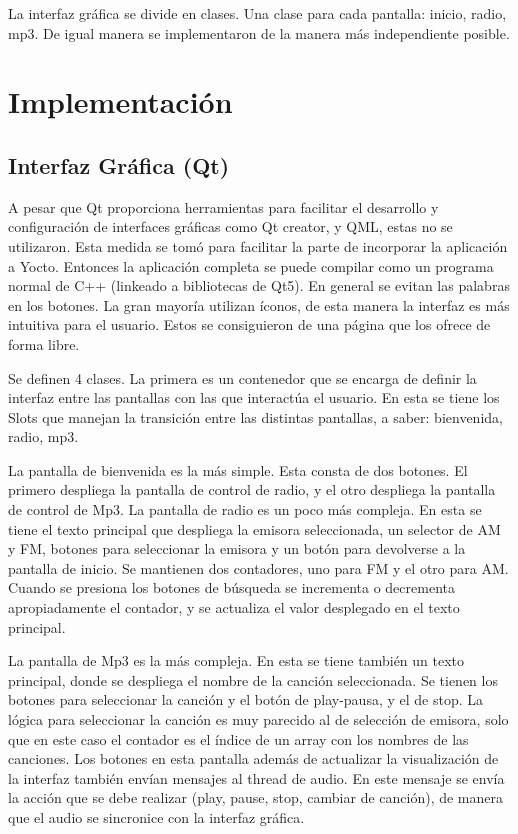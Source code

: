 La interfaz gráfica se divide en clases. Una clase para cada pantalla: inicio, radio, mp3. De igual
manera se implementaron de la manera más independiente posible. 

\section{Implementación}
\label{sec:implementation}
\subsection{Interfaz Gráfica (Qt)}
\label{sec:qt}

A pesar que Qt proporciona herramientas para facilitar el desarrollo y configuración de interfaces
gráficas como Qt creator, y QML, estas no se utilizaron. Esta medida se tomó para facilitar la parte
de incorporar la aplicación a Yocto. Entonces la aplicación completa se puede compilar como un
programa normal de C++ (linkeado a bibliotecas de Qt5). En general se evitan las palabras en los
botones. La gran mayoría utilizan íconos, de esta manera la interfaz es más intuitiva para el
usuario. Estos se consiguieron de una página que los ofrece de forma libre. %

Se definen 4 clases. La primera es un contenedor que se encarga de definir la interfaz entre las
pantallas con las que interactúa el usuario. En esta se tiene los Slots que manejan la transición
entre las distintas pantallas, a saber: bienvenida, radio, mp3.

La pantalla de bienvenida es la más simple. Esta consta de dos botones. El primero despliega la
pantalla de control de radio, y el otro despliega la pantalla de control de Mp3. La pantalla de
radio es un poco más compleja. En esta se tiene el texto principal que despliega la emisora
seleccionada, un selector de AM y FM, botones para seleccionar la emisora y un botón para devolverse
a la pantalla de inicio. Se mantienen dos contadores, uno para FM y el otro para AM. Cuando se
presiona los botones de búsqueda se incrementa o decrementa apropiadamente el contador, y se
actualiza el valor desplegado en el texto principal.

La pantalla de Mp3 es la más compleja. En esta se tiene también un texto principal, donde se
despliega el nombre de la canción seleccionada. Se tienen los botones para seleccionar la canción y
el botón de play-pausa, y el de stop. La lógica para seleccionar la canción es muy parecido al de
selección de emisora, solo que en este caso el contador es el índice de un array con los nombres de
las canciones. Los botones en esta pantalla además de actualizar la visualización de la interfaz
también envían mensajes al thread de audio. En este mensaje se envía la acción que se debe realizar
(play, pause, stop, cambiar de canción), de manera que el audio se sincronice con la interfaz
gráfica. 

